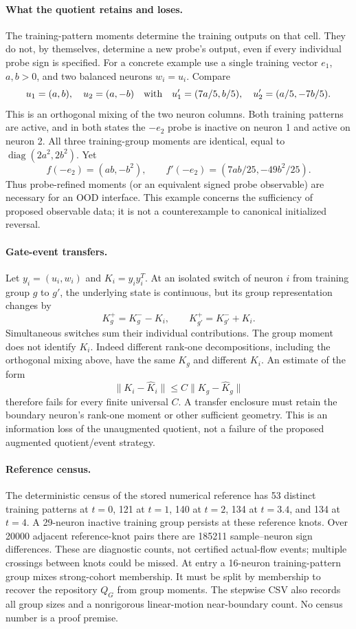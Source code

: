 \paragraph{What the quotient retains and loses.}
The training-pattern moments determine the training outputs on that cell.
They do not, by themselves, determine a new probe's output, even if every
individual probe sign is specified. For a concrete example use a single
training vector $e_1$, $a,b>0$, and two balanced neurons $w_i=u_i$.
Compare
\[
 u_1=(a,b),\quad u_2=(a,-b)
 \quad\hbox{with}\quad
 u'_1=(7a/5,b/5),\quad u'_2=(a/5,-7b/5).
\]
This is an orthogonal mixing of the two neuron columns. Both training
patterns are active, and in both states the $-e_2$ probe is inactive on
neuron 1 and active on neuron 2. All three training-group moments are
identical, equal to $\operatorname{diag}(2a^2,2b^2)$. Yet
\[
 f(-e_2)=(ab,-b^2),\qquad
 f'(-e_2)=(7ab/25,-49b^2/25).
\]
Thus probe-refined moments (or an equivalent signed probe observable)
are necessary for an OOD interface. This example concerns the sufficiency
of proposed observable data; it is not a counterexample to canonical
initialized reversal.

\paragraph{Gate-event transfers.}
Let $y_i=(u_i,w_i)$ and $K_i=y_iy_i^T$. At an isolated switch of neuron $i$
from training group $g$ to $g'$, the underlying state is continuous, but
its group representation changes by
\[
 K_g^+=K_g^- -K_i,\qquad K_{g'}^+=K_{g'}^-+K_i.
\]
Simultaneous switches sum their individual contributions. The group moment
does not identify $K_i$. Indeed different rank-one decompositions, including
the orthogonal mixing above, have the same $K_g$ and different $K_i$.
An estimate of the form
\begin{equation}\label{eq:invalid-transfer-bound}
 \|K_i-\widehat K_i\|\le C\|K_g-\widehat K_g\|
\end{equation}
therefore fails for every finite universal $C$. A transfer enclosure must
retain the boundary neuron's rank-one moment or other sufficient geometry.
This is an information loss of the unaugmented quotient, not a failure of
the proposed augmented quotient/event strategy.

\paragraph{Reference census.}
The deterministic census of the stored numerical reference has 53 distinct
training patterns at $t=0$, 121 at $t=1$, 140 at $t=2$, 134 at $t=3.4$,
and 134 at $t=4$. A 29-neuron inactive training group persists at these
reference knots. Over 20000 adjacent reference-knot pairs there are 185211
sample--neuron sign differences. These are diagnostic counts, not certified
actual-flow events; multiple crossings between knots could be missed.
At entry a 16-neuron training-pattern group mixes strong-cohort membership.
It must be split by membership to recover the repository $Q_G$ from group
moments. The stepwise CSV also records all group sizes and a nonrigorous
linear-motion near-boundary count. No census number is a proof premise.
